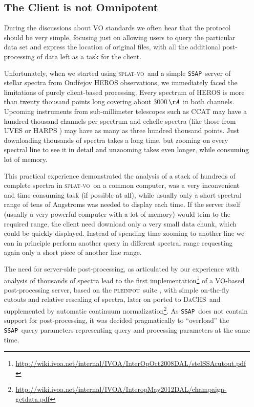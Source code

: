 \documentclass[final,authoryear,5p,times,twocolumn]{elsarticle}
\newcommand{\ssap}{\texttt{SSAP}}
\newcommand{\splatvo}{\textsc{splat-vo}}
\newcommand{\dachs}{\textsc{DaCHS}}
\newcommand{\pleinpot}{\textsc{pleinpot}}
\begin{document}
\subsection{The Client is not Omnipotent}

During the discussions about VO standards we often hear that the
protocol should be very simple, focusing just on allowing users to
query the particular data set and express the location of original
files, with all the additional post-processing of data left as a task
for the client.

Unfortunately, when we started using \splatvo\ and a simple \ssap\ server
of stellar spectra from Ond\v{r}ejov HEROS observations, we
immediately faced the limitations of purely client-based
processing. Every spectrum of HEROS \citep{2002PAICz..90....1S} is more than twenty thousand
points long covering about 3000\,$\AA$ in both channels. Upcoming
instruments from sub-millimeter telescopes such as CCAT
\citep{jenness_adassxxiii} may have a hundred thousand channels per
spectrum and echelle spectra (like those from UVES
\citep{2000SPIE.4008..534D} or HARPS \citep{2000SPIE.4008..582P}) may have
as many as three hundred thousand points. Just downloading thousands
of spectra takes a long time, but zooming on every spectral line to
see it in detail and unzooming takes even longer, while consuming lot
of memory.

This practical experience demonstrated the analysis of a stack of hundreds
of complete spectra in \splatvo\ on a common computer, was a very inconvenient and
time consuming task (if possible at all), while usually only a short spectral
range of tens of Angstroms was needed to display each time.  If the server
itself (usually a very powerful computer with a lot of memory) would trim to
the required range, the client need download only a very small data chunk,
which could be quickly displayed.  Instead of spending time zooming to another
line we can in principle perform another query in different spectral range
requesting again only a short piece of another line range.

The need for server-side post-processing, as articulated by our
experience with analysis of thousands of spectra lead to the first
implementation\footnote{\url{http://wiki.ivoa.net/internal/IVOA/InterOpOct2008DAL/stelSSAcutout.pdf}}
of a VO-based post-processing server, based on the \pleinpot\ suite
\citep{2005ASPC..347..385C}, with simple on-the-fly cutouts and
relative rescaling of spectra, later on ported to \dachs\ and
supplemented by automatic continuum
normalization\footnote{\url{http://wiki.ivoa.net/internal/IVOA/InteropMay2012DAL/champaign-getdata.pdf}}.
As \ssap\ does not contain support for post-processing, it was decided
pragmatically to ``overload'' the \ssap\ query parameters representing
query and processing parameters at the same time.
\end{document}

